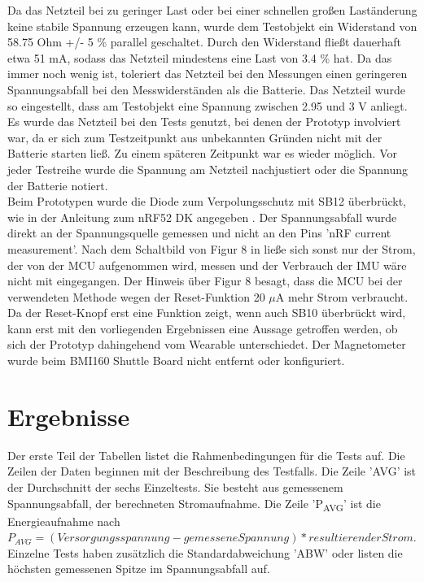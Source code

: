 Da das Netzteil bei zu geringer Last oder bei einer schnellen großen Laständerung keine stabile Spannung erzeugen kann, wurde dem Testobjekt ein Widerstand von 58.75 Ohm +/- 5 \% parallel geschaltet.
Durch den Widerstand fließt dauerhaft etwa 51 mA, sodass das Netzteil mindestens eine Last von 3.4 \% hat.
Da das immer noch wenig ist, toleriert das Netzteil bei den Messungen einen geringeren Spannungsabfall bei den Messwiderständen als die Batterie.
Das Netzteil wurde so eingestellt, dass am Testobjekt eine Spannung zwischen 2.95 und 3 V anliegt.
Es wurde das Netzteil bei den Tests genutzt, bei denen der Prototyp involviert war, da er sich zum Testzeitpunkt aus unbekannten Gründen nicht mit der Batterie starten ließ.
Zu einem späteren Zeitpunkt war es wieder möglich.
Vor jeder Testreihe wurde die Spannung am Netzteil nachjustiert oder die Spannung der Batterie notiert.\\
Beim Prototypen wurde die Diode zum Verpolungsschutz mit SB12 überbrückt, wie in der Anleitung zum nRF52 DK angegeben \cite{site_nrf52dk}.
Der Spannungsabfall wurde direkt an der Spannungsquelle gemessen und nicht an den Pins 'nRF current measurement'.
Nach dem Schaltbild von Figur 8 in \cite{site_nrf52dk} ließe sich sonst nur der Strom, der von der MCU aufgenommen wird, messen und der Verbrauch der IMU wäre nicht mit eingegangen.
Der Hinweis über Figur 8 besagt, dass die MCU bei der verwendeten Methode wegen der Reset-Funktion 20 $\mu$A mehr Strom verbraucht.
Da der Reset-Knopf erst eine Funktion zeigt, wenn auch SB10 überbrückt wird, kann erst mit den vorliegenden Ergebnissen eine Aussage getroffen werden, ob sich der Prototyp dahingehend vom Wearable unterschiedet.
Der Magnetometer wurde beim BMI160 Shuttle Board nicht entfernt oder konfiguriert.

\section{Ergebnisse}
Der erste Teil der Tabellen listet die Rahmenbedingungen für die Tests auf.
Die Zeilen der Daten beginnen mit der Beschreibung des Testfalls.
Die Zeile 'AVG' ist der Durchschnitt der sechs Einzeltests.
Sie besteht aus gemessenem Spannungsabfall, der berechneten Stromaufnahme.
Die Zeile 'P\textsubscript{AVG}' ist die Energieaufnahme nach $P_{AVG} = (Versorgungsspannung - gemesseneSpannung) * resultierender Strom$.
Einzelne Tests haben zusätzlich die Standardabweichung 'ABW' oder listen die höchsten gemessenen Spitze im Spannungsabfall auf.

